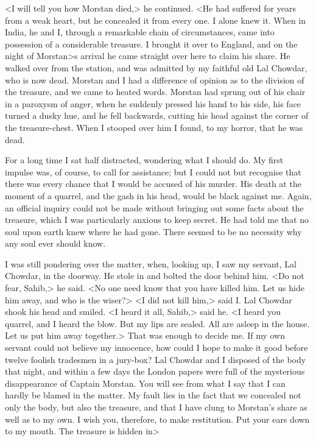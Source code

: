<I will tell you how Morstan died,> he continued. <He had suffered for years from a weak heart, but he concealed it from every one. I alone knew it. When in India, he and I, through a remarkable chain of circumstances, came into possession of a considerable treasure. I brought it over to England, and on the night of Morstan>s arrival he came straight over here to claim his share. He walked over from the station, and was admitted by my faithful old Lal Chowdar, who is now dead. Morstan and I had a difference of opinion as to the division of the treasure, and we came to heated words. Morstan had sprung out of his chair in a paroxysm of anger, when he suddenly pressed his hand to his side, his face turned a dusky hue, and he fell backwards, cutting his head against the corner of the treasure-chest. When I stooped over him I found, to my horror, that he was dead.

For a long time I sat half distracted, wondering what I should do. My first impulse was, of course, to call for assistance; but I could not but recognise that there was every chance that I would be accused of his murder. His death at the moment of a quarrel, and the gash in his head, would be black against me. Again, an official inquiry could not be made without bringing out some facts about the treasure, which I was particularly anxious to keep secret. He had told me that no soul upon earth knew where he had gone. There seemed to be no necessity why any soul ever should know.

I was still pondering over the matter, when, looking up, I saw my servant, Lal Chowdar, in the doorway. He stole in and bolted the door behind him. <Do not fear, Sahib,> he said. <No one need know that you have killed him. Let us hide him away, and who is the wiser?> <I did not kill him,> said I\@. Lal Chowdar shook his head and smiled. <I heard it all, Sahib,> said he. <I heard you quarrel, and I heard the blow. But my lips are sealed. All are asleep in the house. Let us put him away together.> That was enough to decide me. If my own servant could not believe my innocence, how could I hope to make it good before twelve foolish tradesmen in a jury-box? Lal Chowdar and I disposed of the body that night, and within a few days the London papers were full of the mysterious disappearance of Captain Morstan. You will see from what I say that I can hardly be blamed in the matter. My fault lies in the fact that we concealed not only the body, but also the treasure, and that I have clung to Morstan's share as well as to my own. I wish you, therefore, to make restitution. Put your ears down to my mouth. The treasure is hidden in\longdash>

